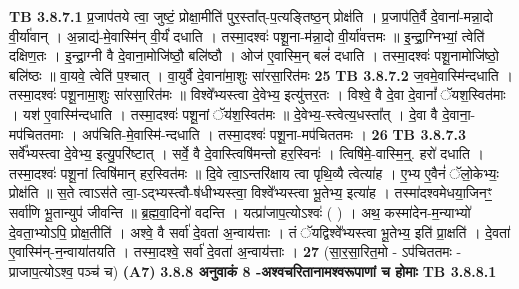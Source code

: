 \documentclass[17pt]{extarticle}
\begin{document}
{{{{{{{{{{{{{{{{{{{{{{                                \textbf{ TB 3.8.7.1} \newline
                  प्र॒जाप॑तये त्वा॒ जुष्टं॒ प्रोक्षा॒मीति॑ पुर॒स्ता᳚त्-प॒त्यङ्तिष्ठ॒न् प्रोक्ष॑ति । प्र॒जाप॑ति॒र्वै दे॒वाना॑-मन्ना॒दो वी॒र्या॑वान् । अ॒न्नाद्य॑-मे॒वास्मि॑न् वी॒र्यं॑ दधाति । तस्मा॒दश्वः॑ पशू॒ना-म॑न्ना॒दो वी॒र्या॑वत्तमः ॥ इ॒न्द्रा॒ग्निभ्यां॒ त्वेति॑ दक्षिण॒तः । इ॒न्द्रा॒ग्नी वै दे॒वाना॒मोजि॑ष्ठौ॒ बलि॑ष्ठौ । ओज॑ ए॒वास्मि॒न् बलं॑ दधाति । तस्मा॒दश्वः॑ पशू॒नामोजि॑ष्ठो॒ बलि॑ष्ठः ॥ वा॒यवे॒ त्वेति॑ प॒श्चात् । वा॒युर्वै दे॒वाना॑मा॒शुः सा॑रसा॒रित॑मः \textbf{ 25} \newline
                  \newline
                                \textbf{ TB 3.8.7.2} \newline
                  ज॒वमे॒वास्मि॑न्दधाति । तस्मा॒दश्वः॑ पशू॒नामा॒शुः सा॑रसा॒रित॑मः ॥ विश्वे᳚भ्यस्त्वा दे॒वेभ्य॒ इत्यु॑त्तर॒तः । विश्वे॒ वै दे॒वा दे॒वानां᳚ ॅयश॒स्वित॑माः । यश॑ ए॒वास्मि॑न्दधाति । तस्मा॒दश्वः॑ पशू॒नां ॅय॑श॒स्वित॑मः ॥ दे॒वेभ्य॒-स्त्वेत्य॒धस्ता᳚त् । दे॒वा वै दे॒वाना॒-मप॑चिततमाः । अप॑चिति-मे॒वास्मि॑-न्दधाति । तस्मा॒दश्वः॑ पशू॒ना-मप॑चिततमः । \textbf{ 26} \newline
                  \newline
                                \textbf{ TB 3.8.7.3} \newline
                  सर्वे᳚भ्यस्त्वा दे॒वेभ्य॒ इत्यु॒परि॑ष्टात् । सर्वे॒ वै दे॒वास्त्विषि॑मन्तो हर॒स्विनः॑ । त्विषि॑मे॒-वास्मि॒न्॒. हरो॑ दधाति । तस्मा॒दश्वः॑ पशू॒नां त्विषि॑मान् हर॒स्वित॑मः ॥ दि॒वे त्वा॒ऽन्तरि॑क्षाय त्वा पृथि॒व्यै त्वेत्या॑ह । ए॒भ्य ए॒वैनं॑ ॅलो॒केभ्यः॒ प्रोक्ष॑ति ॥ स॒ते त्वाऽस॑ते त्वा॒-ऽद्भ्यस्त्वौ-ष॑धीभ्यस्त्वा॒ विश्वे᳚भ्यस्त्वा भू॒तेभ्य॒ इत्या॑ह । तस्मा॑दश्वमेधया॒जिनꣳ॒॒ सर्वा॑णि भू॒तान्युप॑ जीवन्ति ॥ ब्र॒ह्म॒वा॒दिनो॑ वदन्ति । यत्प्रा॑जाप॒त्योऽश्वः॑ ( ) । अथ॒ कस्मा॑देन-म॒न्याभ्यो॑ दे॒वता॒भ्योऽपि॒ प्रोक्ष॒तीति॑ । अश्वे॒ वै सर्वा॑ दे॒वता॑ अ॒न्वाय॑त्ताः । तं ॅयद्विश्वे᳚भ्यस्त्वा भू॒तेभ्य॒ इति॑ प्रा॒क्षति॑ । दे॒वता॑ ए॒वास्मि॑न्-न॒न्वाया॑तयति । तस्मा॒दश्वे॒ सर्वा॑ दे॒वता॑ अ॒न्वाय॑त्ताः । \textbf{ 27} \newline
                  \newline
                                    (सा॒र॒सा॒रित॒मो - ऽप॑चिततमः - प्राजाप॒त्योऽश्व॒ पञ्च॑ च) \textbf{(A7)} \newline \newline
                \textbf{ 3.8.8     अनुवाकं   8 -अश्वचरितानामश्वरूपाणां च होमाः} \newline
                                \textbf{ TB 3.8.8.1} \newline
}}}}}}}}}}}}}}}}}}}}}}
\end{document}
